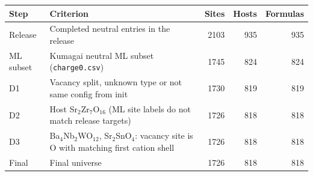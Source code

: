 \begin{tabular}{llrrr}
\toprule
Step & Criterion & Sites & Hosts & Formulas \\
\midrule
Release & Completed neutral entries in the release & 2103 & 935 & 935 \\
ML subset & Kumagai neutral ML subset (\texttt{charge0.csv}) & 1745 & 824 & 824 \\
D1 & Vacancy split, unknown type or not same config from init & 1730 & 819 & 819 \\
D2 & Host Sr$_{2}$Zr$_{7}$O$_{16}$ (ML site labels do not match release targets) & 1726 & 818 & 818 \\
D3 & Ba$_{4}$Nb$_{2}$WO$_{12}$, Sr$_{2}$SnO$_{4}$: vacancy site is O with matching first cation shell & 1726 & 818 & 818 \\
\midrule
Final & Final universe & 1726 & 818 & 818 \\
\bottomrule
\end{tabular}
